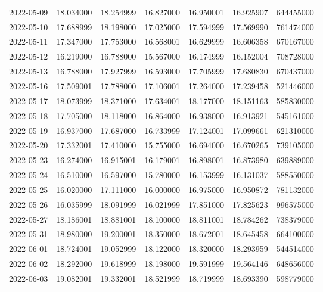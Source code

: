 \begin{tabular}{lrrrrrr}
2022-05-09 &   18.034000 &   18.254999 &   16.827000 &   16.950001 &   16.925907 &   644455000 \\
2022-05-10 &   17.688999 &   18.198000 &   17.025000 &   17.594999 &   17.569990 &   761474000 \\
2022-05-11 &   17.347000 &   17.753000 &   16.568001 &   16.629999 &   16.606358 &   670167000 \\
2022-05-12 &   16.219000 &   16.788000 &   15.567000 &   16.174999 &   16.152004 &   708728000 \\
2022-05-13 &   16.788000 &   17.927999 &   16.593000 &   17.705999 &   17.680830 &   670437000 \\
2022-05-16 &   17.509001 &   17.788000 &   17.106001 &   17.264000 &   17.239458 &   521446000 \\
2022-05-17 &   18.073999 &   18.371000 &   17.634001 &   18.177000 &   18.151163 &   585830000 \\
2022-05-18 &   17.705000 &   18.118000 &   16.864000 &   16.938000 &   16.913921 &   545161000 \\
2022-05-19 &   16.937000 &   17.687000 &   16.733999 &   17.124001 &   17.099661 &   621310000 \\
2022-05-20 &   17.332001 &   17.410000 &   15.755000 &   16.694000 &   16.670265 &   739105000 \\
2022-05-23 &   16.274000 &   16.915001 &   16.179001 &   16.898001 &   16.873980 &   639889000 \\
2022-05-24 &   16.510000 &   16.597000 &   15.780000 &   16.153999 &   16.131037 &   588550000 \\
2022-05-25 &   16.020000 &   17.111000 &   16.000000 &   16.975000 &   16.950872 &   781132000 \\
2022-05-26 &   16.035999 &   18.091999 &   16.021999 &   17.851000 &   17.825623 &   996575000 \\
2022-05-27 &   18.186001 &   18.881001 &   18.100000 &   18.811001 &   18.784262 &   738379000 \\
2022-05-31 &   18.980000 &   19.200001 &   18.350000 &   18.672001 &   18.645458 &   664100000 \\
2022-06-01 &   18.724001 &   19.052999 &   18.122000 &   18.320000 &   18.293959 &   544514000 \\
2022-06-02 &   18.292000 &   19.618999 &   18.198000 &   19.591999 &   19.564146 &   648656000 \\
2022-06-03 &   19.082001 &   19.332001 &   18.521999 &   18.719999 &   18.693390 &   598779000 \\

\end{tabular}
